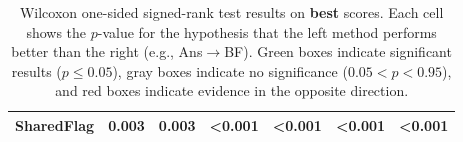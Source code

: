 \begin{table}[ht]
\begin{tabular}{|l|c|c|c|c|c|c|}
SharedFlag & \colorbox{green!25}{0.003} & \colorbox{green!25}{0.003} & \colorbox{green!25}{<0.001} & \colorbox{green!25}{<0.001} & \colorbox{green!25}{<0.001} & \colorbox{green!25}{<0.001} \\ \hline
\end{tabular}
\caption{Wilcoxon one-sided signed-rank test results on \textbf{best} scores. Each cell shows the $p$-value for the hypothesis that the left method performs better than the right (e.g., Ans$\rightarrow$BF). \colorbox{green!25}{Green boxes} indicate significant results ($p\le0.05$), \colorbox{gray!25}{gray boxes} indicate no significance ($0.05<p<0.95$), and \colorbox{red!25}{red boxes} indicate evidence in the opposite direction.} \label{tab:wilcoxon-best}
\end{table}